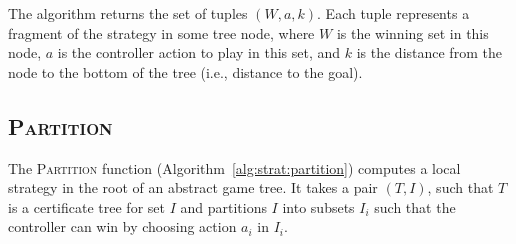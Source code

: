 %

The algorithm returns the set of tuples $(W, a, k)$.  Each tuple
represents a fragment of the strategy in some tree node, where $W$
is the winning set in this node, $a$ is the controller action to
play in this set, and $k$ is the distance from the node to the
bottom of the tree (i.e., distance to the goal).



\subsection{\textsc{Partition}}

The \textsc{Partition} function
(Algorithm~\ref{alg:strat:partition}) computes a local strategy in
the root of an abstract game tree.  It takes a pair $(T,I)$, such
that $T$ is a certificate tree for set $I$ and partitions $I$ into
subsets $I_i$ such that the controller can win by choosing action
$a_i$ in $I_i$.

